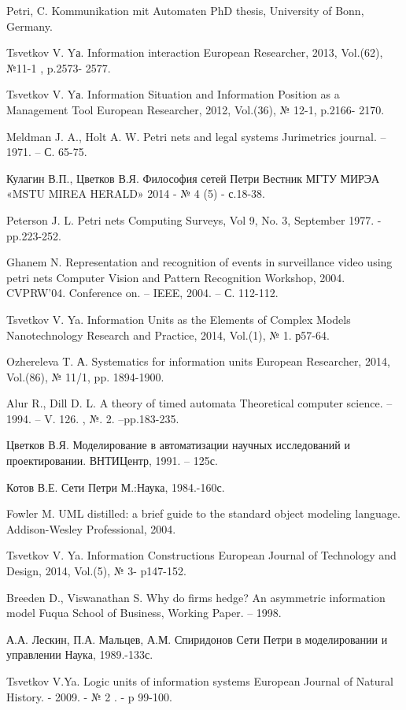\begin{thebibliography}

Petri, C.
Kommunikation mit Automaten
PhD thesis, University of Bonn, Germany.

Tsvetkov V. Yа.
Information interaction
European Researcher, 2013, Vol.(62), №11-1 , p.2573- 2577.

Tsvetkov V. Yа.
Information Situation and Information Position as a Management Tool
European Researcher, 2012, Vol.(36), № 12-1, p.2166- 2170.

Meldman J. A., Holt A. W.
Petri nets and legal systems
Jurimetrics journal. – 1971. – С. 65-75.

Кулагин В.П., Цветков В.Я. 
Философия сетей Петри
Вестник МГТУ МИРЭА «MSTU MIREA HERALD» 2014 - № 4 (5) - с.18-38.

Peterson J. L. 
Petri nets
Computing Surveys, Vol 9, No. 3, September 1977. - pp.223-252.

Ghanem N. 
Representation and recognition of events in surveillance video using petri nets 
Computer Vision and Pattern Recognition Workshop, 2004. CVPRW'04. Conference on. – IEEE, 2004. – С. 112-112.

Tsvetkov V. Ya.
Information Units as the Elements of Complex Models
Nanotechnology Research and Practice, 2014, Vol.(1), № 1. р57-64.

Ozhereleva T. А. 
Systematics for information units
European Researcher, 2014, Vol.(86), № 11/1, pp. 1894-1900.

Alur R., Dill D. L. 
A theory of timed automata
Theoretical computer science. – 1994. – V. 126. , №. 2. –pp.183-235.

Цветков В.Я. 
Моделирование в автоматизации научных исследований и проектировании.
ВНТИЦентр, 1991. – 125с.

Котов В.Е.
Сети Петри
М.:Наука, 1984.-160с.

Fowler M. 
UML distilled: a brief guide to the standard object modeling language.
Addison-Wesley Professional, 2004.

Tsvetkov V. Ya. 
Information Constructions
European Journal of Technology and Design, 2014, Vol.(5), № 3- p147-152.

Breeden D., Viswanathan S. 
Why do firms hedge? An asymmetric information model
Fuqua School of Business, Working Paper. – 1998.

А.А. Лескин, П.А. Мальцев, А.М. Спиридонов
Сети Петри в моделировании и управлении
Наука, 1989.-133с.

Tsvetkov V.Ya. 
Logic units of information systems
European Journal of Natural History. - 2009. - № 2 . - p 99-100.

\end{thebibliography}


